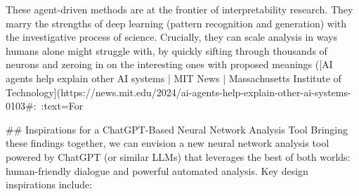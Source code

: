 These agent-driven methods are at the frontier of interpretability research. They marry the strengths of deep learning (pattern recognition and generation) with the investigative process of science. Crucially, they can scale analysis in ways humans alone might struggle with, by quickly sifting through thousands of neurons and zeroing in on the interesting ones with proposed meanings ([AI agents help explain other AI systems | MIT News | Massachusetts Institute of Technology](https://news.mit.edu/2024/ai-agents-help-explain-other-ai-systems-0103#:~:text=For%

## Inspirations for a ChatGPT-Based Neural Network Analysis Tool
Bringing these findings together, we can envision a new neural network analysis tool powered by ChatGPT (or similar LLMs) that leverages the best of both worlds: human-friendly dialogue and powerful automated analysis. Key design inspirations include:

